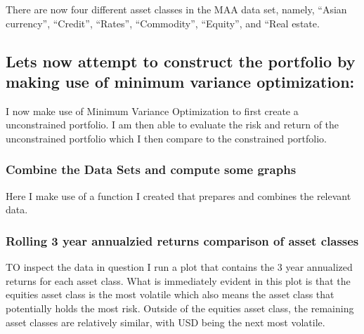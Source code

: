 \documentclass[11pt,preprint, authoryear]{elsarticle}
\numberwithin{equation}{section}
\numberwithin{figure}{section}
\numberwithin{table}{section}
\begin{document}
There are now four different asset classes in the MAA data set, namely,
``Asian currency'', ``Credit'', ``Rates'', ``Commodity'', ``Equity'',
and ``Real estate.

\hypertarget{lets-now-attempt-to-construct-the-portfolio-by-making-use-of-minimum-variance-optimization}{%
\subsection{Lets now attempt to construct the portfolio by making use of
minimum variance
optimization:}\label{lets-now-attempt-to-construct-the-portfolio-by-making-use-of-minimum-variance-optimization}}

I now make use of Minimum Variance Optimization to first create a
unconstrained portfolio. I am then able to evaluate the risk and return
of the unconstrained portfolio which I then compare to the constrained
portfolio.

\hypertarget{combine-the-data-sets-and-compute-some-graphs}{%
\subsubsection{Combine the Data Sets and compute some
graphs}\label{combine-the-data-sets-and-compute-some-graphs}}

Here I make use of a function I created that prepares and combines the
relevant data.

\hypertarget{rolling-3-year-annualzied-returns-comparison-of-asset-classes}{%
\subsubsection{Rolling 3 year annualzied returns comparison of asset
classes}\label{rolling-3-year-annualzied-returns-comparison-of-asset-classes}}

TO inspect the data in question I run a plot that contains the 3 year
annualized returns for each asset class. What is immediately evident in
this plot is that the equities asset class is the most volatile which
also means the asset class that potentially holds the most risk. Outside
of the equities asset class, the remaining asset classes are relatively
similar, with USD being the next most volatile.
\end{document}
